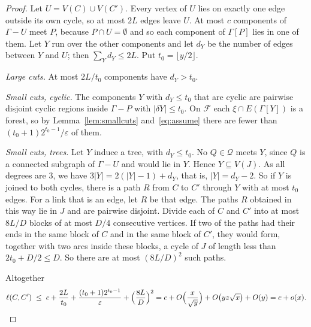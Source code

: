 \begin{proof}
Let $U=V(C)\cup V(C')$. Every vertex of $U$ lies on exactly one edge outside its own cycle, so at
most $2L$ edges leave $U$. At most $c$ components of $\Gamma-U$ meet $P$, because $P\cap U=\emptyset$
and so each component of $\Gamma[P]$ lies in one of them. Let $Y$ run over the other components and
let $d_Y$ be the number of edges between $Y$ and $U$; then $\sum_Yd_Y\le2L$. Put
$t_0=\lfloor y/2\rfloor$.

\emph{Large cuts.} At most $2L/t_0$ components have $d_Y>t_0$.

\emph{Small cuts, cyclic.} The components $Y$ with $d_Y\le t_0$ that are cyclic are pairwise
disjoint cyclic regions inside $\Gamma-P$ with $|\delta Y|\le t_0$. On $\mathcal{F}$ each
$\xi\cap E(\Gamma[Y])$ is a forest, so by Lemma~\ref{lem:smallcuts} and~\eqref{eq:assume} there are
fewer than $(t_0+1)2^{t_0-1}/\varepsilon$ of them.

\emph{Small cuts, trees.} Let $Y$ induce a tree, with $d_Y\le t_0$. No $Q\in\mathcal{Q}$ meets $Y$,
since $Q$ is a connected subgraph of $\Gamma-U$ and would lie in $Y$. Hence $Y\subseteq V(J)$. As
all degrees are $3$, we have $3|Y|=2(|Y|-1)+d_Y$, that is, $|Y|=d_Y-2$. So if $Y$ is joined to both
cycles, there is a path $R$ from $C$ to $C'$ through $Y$ with at most $t_0$ edges. For a link that
is an edge, let $R$ be that edge. The paths $R$ obtained in this way lie in $J$ and are pairwise
disjoint. Divide each of $C$ and $C'$ into at most $8L/D$ blocks of at most $D/4$ consecutive
vertices. If two of the paths had their ends in the same block of $C$ and in the same block of $C'$,
they would form, together with two arcs inside these blocks, a cycle of $J$ of length less than
$2t_0+D/2\le D$. So there are at most $(8L/D)^{2}$ such paths.

Altogether
\[
  \ell(C,C')\;\le\;c+\frac{2L}{t_0}+\frac{(t_0+1)2^{t_0-1}}{\varepsilon}+\Bigl(\frac{8L}{D}\Bigr)^{2}
  =c+O\Bigl(\frac{x}{\sqrt y}\Bigr)+O\bigl(yz\sqrt x\bigr)+O(y)=c+o(x).\qedhere
\]
\end{proof}

